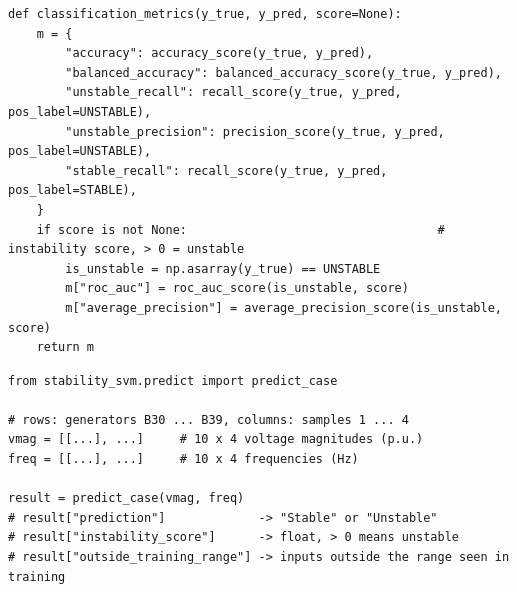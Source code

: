 \documentclass[11pt,a4paper]{article}
\newcommand{\code}[1]{\texttt{#1}}
\begin{document}
\begin{lstlisting}[caption={Metrics with the unstable class as the positive class (\code{evaluate.py}).}]
def classification_metrics(y_true, y_pred, score=None):
    m = {
        "accuracy": accuracy_score(y_true, y_pred),
        "balanced_accuracy": balanced_accuracy_score(y_true, y_pred),
        "unstable_recall": recall_score(y_true, y_pred, pos_label=UNSTABLE),
        "unstable_precision": precision_score(y_true, y_pred, pos_label=UNSTABLE),
        "stable_recall": recall_score(y_true, y_pred, pos_label=STABLE),
    }
    if score is not None:                                   # instability score, > 0 = unstable
        is_unstable = np.asarray(y_true) == UNSTABLE
        m["roc_auc"] = roc_auc_score(is_unstable, score)
        m["average_precision"] = average_precision_score(is_unstable, score)
    return m
\end{lstlisting}

\begin{lstlisting}[caption={Predicting a new case from the $10 \times 4$ voltage and frequency samples (\code{predict.py}).}]
from stability_svm.predict import predict_case

# rows: generators B30 ... B39, columns: samples 1 ... 4
vmag = [[...], ...]     # 10 x 4 voltage magnitudes (p.u.)
freq = [[...], ...]     # 10 x 4 frequencies (Hz)

result = predict_case(vmag, freq)
# result["prediction"]             -> "Stable" or "Unstable"
# result["instability_score"]      -> float, > 0 means unstable
# result["outside_training_range"] -> inputs outside the range seen in training
\end{lstlisting}

\end{document}

